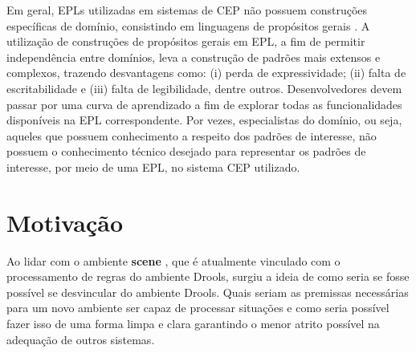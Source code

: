 \documentclass[
	12pt,				%
	openright,			%
	twoside,			%
	a4paper,			%
	english,			%
	french,				%
	spanish,			%
	brazil,				%
	]{abntex2}
\begin{document}
Em geral, EPLs utilizadas em sistemas de CEP não possuem construções específicas de domínio, consistindo em linguagens de propósitos gerais \cite{bruns-2014}. A utilização de construções de propósitos gerais em EPL, a fim de permitir independência entre domínios, leva a construção de padrões mais extensos e complexos, trazendo desvantagens como: (i) perda de expressividade; (ii) falta de escritabilidade e (iii) falta de legibilidade, dentre outros. Desenvolvedores devem passar por uma curva de aprendizado a fim de explorar todas as funcionalidades disponíveis na EPL correspondente. Por vezes, especialistas do domínio, ou seja, aqueles que possuem conhecimento a respeito dos padrões de interesse, não possuem o conhecimento técnico desejado para representar os padrões de interesse, por meio de uma EPL, no sistema CEP utilizado.
% 
% 


\chapter{Motivação} %

Ao lidar com o ambiente \textbf{scene} \cite{pereira-2013}, que é atualmente  vinculado com o processamento de regras do ambiente Drools, surgiu a ideia de como seria se fosse possível se desvincular do ambiente Drools. Quais seriam as premissas necessárias para um novo ambiente ser capaz de processar situações e como seria possível fazer isso de uma forma limpa e clara garantindo o menor atrito possível na adequação de outros sistemas.
% 
% 
% 
% 
% 
% 
% 
% 
\end{document}
